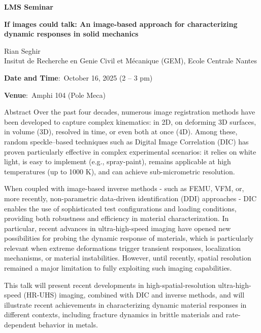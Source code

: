 \documentclass[a4paper,12pt,fleqn]{article}
\begin{document}
	\sffamily
\thispagestyle{titlepage}
\vspace*{-3em}
\begin{center}
	\huge \textbf{LMS Seminar}
\end{center}
\begin{center}
	\Large 
	\textbf{If images could talk: An image-based approach for characterizing dynamic responses in solid mechanics} 
\end{center}
\begin{center}
	\Large
	Rian Seghir \\
	{\large Insitut de Recherche en Genie Civil et M{\'{e}canique} (GEM), Ecole Centrale Nantes} \\
	\vspace*{1em}
	{\Large
	\textbf{Date and Time}:~October 16, 2025 (2 -- 3 pm)
	
	\textbf{Venue}:~Amphi 104 (Pole Meca) }
\end{center}
\vspace*{-1em}
\begin{myhlbox}{{Abstract}}
	Over the past four decades, numerous image registration methods have been developed to capture complex kinematics: in 2D, on deforming 3D surfaces, in volume (3D), resolved in time, or even both at once (4D). Among these, random speckle–based techniques such as Digital Image Correlation (DIC) has proven particularly effective in complex experimental scenarios: it relies on white light, is easy to implement (e.g., spray-paint), remains applicable at high temperatures (up to 1000 K), and can achieve sub-micrometric resolution.
	
	When coupled with image-based inverse methods - such as FEMU, VFM, or, more recently, non-parametric data-driven identification (DDI) approaches - DIC enables the use of sophisticated test configurations and loading conditions, providing both robustness and efficiency in material characterization. In particular, recent advances in ultra-high-speed imaging have opened new possibilities for probing the dynamic response of materials, which is particularly relevant when extreme deformations trigger transient responses, localization mechanisms, or material instabilities. However, until recently, spatial resolution remained a major limitation to fully exploiting such imaging capabilities.
	
	This talk will present recent developments in high-spatial-resolution ultra-high-speed (HR-UHS) imaging, combined with DIC and inverse methods, and will illustrate recent achievements in characterizing dynamic material responses in different contexts, including fracture dynamics in brittle materials and rate-dependent behavior in metals.
\end{myhlbox}
\end{document}
